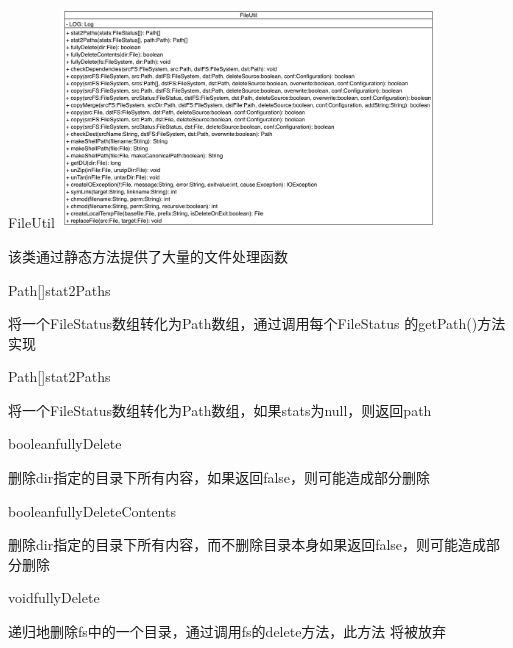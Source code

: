 \begin{XeClass}{FileUtil}
\includegraphics[width=10cm]{cdig/FileUtil.png}
     
 该类通过静态方法提供了大量的文件处理函数

    \begin{XeMethod}{\XePublic}{Path[]}{stat2Paths}
         
 将一个FileStatus数组转化为Path数组，通过调用每个FileStatus
 的getPath()方法实现

    \end{XeMethod}

    \begin{XeMethod}{\XePublic}{Path[]}{stat2Paths}
         
 将一个FileStatus数组转化为Path数组，如果stats为null，则返回path

    \end{XeMethod}

    \begin{XeMethod}{\XePublic}{boolean}{fullyDelete}
         
 删除dir指定的目录下所有内容，如果返回false，则可能造成部分删除

    \end{XeMethod}

    \begin{XeMethod}{\XePublic}{boolean}{fullyDeleteContents}
         
 删除dir指定的目录下所有内容，而不删除目录本身如果返回false，则可能造成部分删除

    \end{XeMethod}

    \begin{XeMethod}{\XePublic}{void}{fullyDelete}
         
 递归地删除fs中的一个目录，通过调用fs的delete方法，此方法
 将被放弃

    \end{XeMethod}


\end{XeClass}
